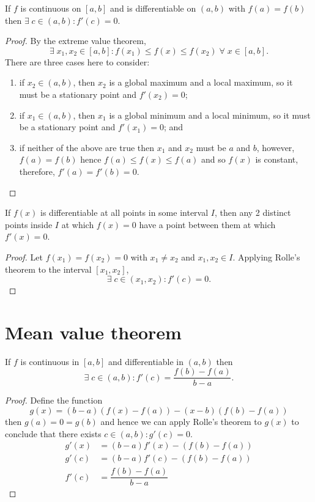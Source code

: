\begin{theorem}
    If $f$ is continuous on $[a,b]$ and is differentiable on $(a,b)$ with $f(a)=f(b)$ then $\exists\;c\in(a,b):f'(c)=0$.
\end{theorem} 

\begin{proof}
    By the extreme value theorem, \[\exists\;x_1,x_2\in[a,b]:f(x_1)\leq f(x)\leq f(x_2)\;\forall\;x\in[a,b].\] There are three cases here to consider:
    \begin{enumerate}
        \item if $x_2\in(a,b)$, then $x_2$ is a global maximum and a local maximum, so it must be a stationary point and $f'(x_2)=0$;
        \item if $x_1\in(a,b)$, then $x_1$ is a global minimum and a local minimum, so it must be a stationary point and $f'(x_1)=0$; and
        \item if neither of the above are true then $x_1$ and $x_2$ must be $a$ and $b$, however, $f(a)=f(b)$ hence $f(a)\leq f(x)\leq f(a)$ and so $f(x)$ is constant, therefore, $f'(a)=f'(b)=0$.
    \end{enumerate}
\end{proof}

\begin{corollary}
    If $f(x)$ is differentiable at all points in some interval $I$, then any 2 distinct points inside $I$ at which $f(x)=0$ have a point between them at which $f'(x)=0$.
\end{corollary}

\begin{proof}
    Let $f(x_1)=f(x_2)=0$ with $x_1\neq x_2$ and $x_1,x_2\in I$. Applying Rolle's theorem to the interval $[x_1,x_2]$, \[\exists\;c\in(x_1,x_2):f'(c)=0.\]
\end{proof}

\section{Mean value theorem}

\begin{theorem}
If $f$ is continuous in $[a,b]$ and differentiable in $(a,b)$ then \[\exists\;c\in(a,b):f'(c)=\dfrac{f(b)-f(a)}{b-a}.\]
\end{theorem}

\begin{proof}
    Define the function \[g(x)=(b-a)(f(x)-f(a))-(x-b)(f(b)-f(a))\] then $g(a)=0=g(b)$ and hence we can apply Rolle's theorem to $g(x)$ to conclude that there exists $c\in(a,b):g'(c)=0$.
    \begin{align*}
        g'(x)&=(b-a)f'(x)-(f(b)-f(a))\\
        g'(c)&=(b-a)f'(c)-(f(b)-f(a))\\
        f'(c)&=\dfrac{f(b)-f(a)}{b-a}
    \end{align*}
\end{proof}

